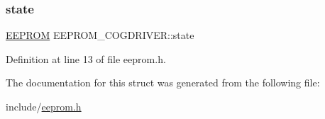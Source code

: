 \subsubsection{\texorpdfstring{state}{state}}
{\footnotesize\ttfamily \mbox{\hyperlink{structEEPROM}{E\+E\+P\+R\+OM}} E\+E\+P\+R\+O\+M\+\_\+\+C\+O\+G\+D\+R\+I\+V\+E\+R\+::state}



Definition at line 13 of file eeprom.\+h.



The documentation for this struct was generated from the following file\+:\begin{DoxyCompactItemize}
\item 
include/\mbox{\hyperlink{eeprom_8h}{eeprom.\+h}}\end{DoxyCompactItemize}
